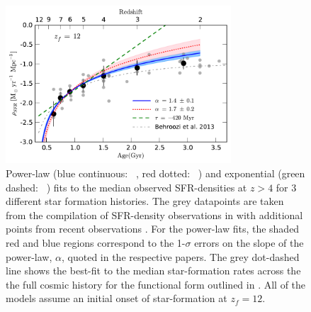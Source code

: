 \begin{figure}
    \centering
  \includegraphics[width=0.75\textwidth]{plots/Fig4.pdf}
  \caption[Power-law (blue continuous: \citeauthor{2015ApJ...799..183S}~\citeyear{2015ApJ...799..183S}, red dotted: \citeauthor{2011MNRAS.412.1123P}~\citeyear{2011MNRAS.412.1123P}) and exponential (green dashed: \citeauthor{2011MNRAS.412.1123P}~\citeyear{2011MNRAS.412.1123P}) fits to the median observed SFR-densities at $z > 4$ for 3 different star formation histories.]{Power-law (blue continuous: \citeauthor{2015ApJ...799..183S}~\citeyear{2015ApJ...799..183S}, red dotted: \citeauthor{2011MNRAS.412.1123P}~\citeyear{2011MNRAS.412.1123P}) and exponential (green dashed: \citeauthor{2011MNRAS.412.1123P}~\citeyear{2011MNRAS.412.1123P}) fits to the median observed SFR-densities at $z > 4$ for 3 different star formation histories. The grey datapoints are taken from the compilation of SFR-density observations in \citet{Behroozi:2013fg} with additional points from recent observations \citep{Smit:2012is,2015ApJ...803...34B,Duncan:2014gh}. For the power-law fits, the shaded red and blue regions correspond to the 1-$\sigma$ errors on the slope of the power-law, $\alpha$, quoted in the respective papers.  The grey dot-dashed line shows the best-fit to the median star-formation rates across the the full cosmic history for the functional form outlined in \citet{Behroozi:2013fg}. All of the models assume an initial onset of star-formation at $z_{f} = 12$.}
  \label{reion-fig:SFH}
\end{figure}

